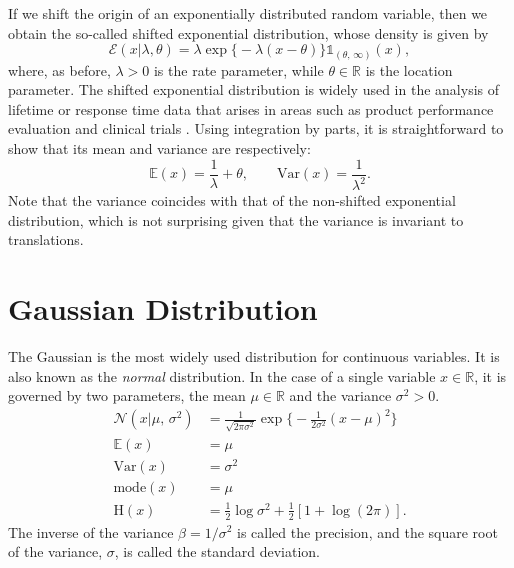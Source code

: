If we shift the origin of an exponentially distributed random variable, then we obtain the so-called shifted exponential distribution, whose density is given by
\begin{equation}
	\mathcal{E}(x|\lambda, \theta)
	= \lambda\exp\Big\{-\lambda(x - \theta)\Big\}\mathds{1}_{(\theta,\, \infty)}(x),
\end{equation}
where, as before, $\lambda > 0$ is the rate parameter, while $\theta \in \mathbb{R}$ is the location parameter. The shifted exponential distribution is widely used in the analysis of lifetime or response time data that arises in areas such as product performance evaluation and clinical trials \citep{bain78, lawless82}. Using integration by parts, it is straightforward to show that its mean and variance are respectively:
\begin{equation}
\label{eq:shifted-exponential-moments}
	\mathbb{E}(x) = \frac{1}{\lambda} + \theta,
	\qquad
	\mathrm{Var}(x) = \frac{1}{\lambda^2}.
\end{equation}
Note that the variance coincides with that of the non-shifted exponential distribution, which is not surprising given that the variance is invariant to translations.


\section{Gaussian Distribution}

The Gaussian is the most widely used distribution for continuous variables. It is also known as the \emph{normal} distribution. In the case of a single variable $x \in \mathbb{R}$, it is governed by two parameters, the mean $\mu \in \mathbb{R}$ and the variance $\sigma^2 > 0$.
\begin{align}
	\mathcal{N}(x|\mu,\, \sigma^2)
	&= \frac{1}{\sqrt{2\pi\sigma^2}}\exp\Big\{-\frac{1}{2\sigma^2}(x - \mu)^2\Big\}
	\\
	\mathbb{E}(x) &= \mu
	\\
	\mathrm{Var}(x) &= \sigma^2
	\\
	\mathrm{mode}(x) &= \mu
	\\
	\mathrm{H}(x)
	&= \frac{1}{2}\log\sigma^2 + \frac{1}{2}[1 + \log(2\pi)].
\end{align}
The inverse of the variance $\beta = 1/\sigma^2$ is called the precision, and the square root of the variance, $\sigma$, is called the standard deviation.

